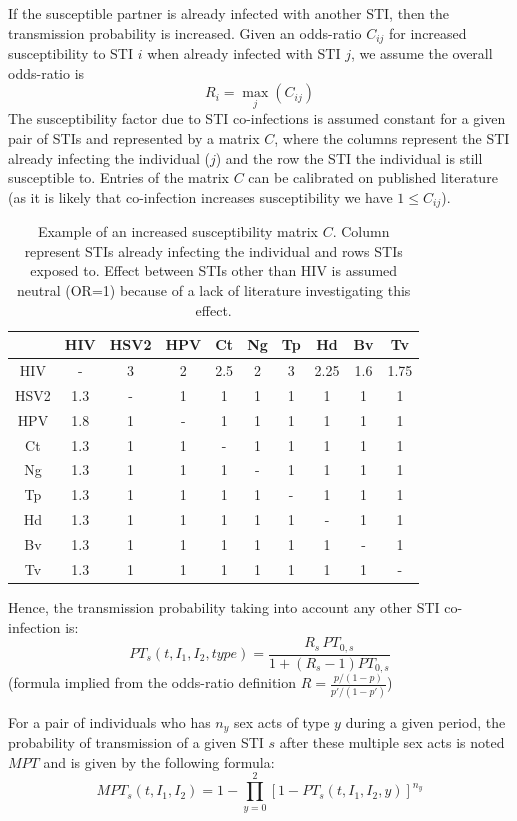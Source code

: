 \documentclass[11pt, onecolumn]{article}
\begin{document}
If the susceptible partner is already infected with another STI, then the transmission probability is increased. Given an odds-ratio $C_{ij}$ for increased susceptibility to STI $i$ when already infected with STI $j$, we assume the overall odds-ratio is
$$R_i = \max_j(C_{ij})$$
The susceptibility factor due to STI co-infections is assumed constant for a given pair of STIs and represented by a matrix $C$, where the columns represent the STI already infecting the individual ($j$) and the row the STI the individual is still susceptible to. 
Entries of the matrix $C$ can be calibrated on published literature (as it is likely that co-infection increases susceptibility we have $1\leq C_{ij}$). 

\begin{table}[htdp]
\begin{center}
\begin{tabular}{|c|c|c|c|c|c|c|c|c|c|}
\hline
&HIV&HSV2&HPV&Ct&Ng&Tp&Hd&Bv&Tv\\
\hline
HIV&-&3&2&2.5&2&3&2.25&1.6&1.75\\
HSV2&1.3&-&1&1&1&1&1&1&1\\
HPV&1.8&1&-&1&1&1&1&1&1\\
Ct&1.3&1&1&-&1&1&1&1&1\\
Ng&1.3&1&1&1&-&1&1&1&1\\
Tp&1.3&1&1&1&1&-&1&1&1\\
Hd&1.3&1&1&1&1&1&-&1&1\\
Bv&1.3&1&1&1&1&1&1&-&1\\
Tv&1.3&1&1&1&1&1&1&1&-\\
\hline
\end{tabular}
\end{center}
\caption{Example of an increased susceptibility matrix $C$. Column represent STIs already infecting the individual and rows STIs exposed to. Effect between STIs other than HIV is assumed neutral (OR=1) because of a lack of literature investigating this effect.}
\label{default}
\end{table}%

Hence, the transmission probability taking into account any other STI co-infection is:
$$PT_s(t,I_1,I_2,type) =\frac{R_s\,  PT_{0,s} }{1+ (R_s-1)PT_{0,s} }$$
(formula implied from the odds-ratio definition $R=\frac{p/(1-p)}{p'/(1-p')}$)

For a pair of individuals who has $n_{y}$ sex acts of type $y$ during a given period, the probability of transmission of a given STI $s$ after these multiple sex acts is noted $MPT$ and is given by the following formula:
$$ MPT_s(t,I_1,I_2) = 1- \prod_{y=0}^{2}[1-PT_s(t,I_1,I_2,y)]^{n_y} $$
\end{document}
